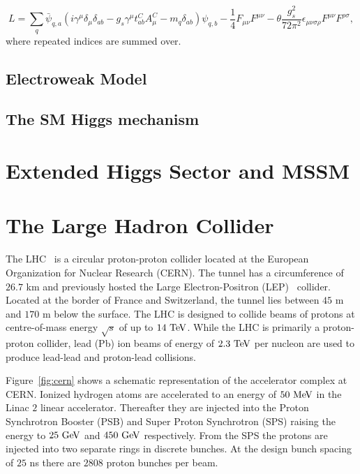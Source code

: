  \begin{equation} \label{eq:lumi}
L = \sum_{q} \bar{\psi}_{q,a} (i \gamma^{\mu}\delta_{\mu}\delta_{ab}-g_{s}\gamma^{\mu}t^{C}_{ab}A^{C}_{\mu}-m_{q}\delta_{ab})\psi_{q,b}-\frac{1}{4}F_{\mu\nu}F^{\mu\nu}-\theta\frac{g_{s}^2}{72\pi^2}\epsilon_{\mu\nu\sigma\rho}F^{\mu\nu}F^{\rho\sigma},
\end{equation}
where repeated indices are summed over.

\subsection{Electroweak Model}

\subsection{The SM Higgs mechanism}

\section{Extended Higgs Sector and MSSM}
    
\section{The Large Hadron Collider}
The LHC~\cite{1748-0221-3-08-S08001} is a circular proton-proton collider located at the European Organization for Nuclear Research (CERN). The tunnel has a circumference of $26.7$ km and previously hosted the Large Electron-Positron (LEP)~\cite{lep1,lep2} collider. Located at the border of France and Switzerland, the tunnel lies between $45$ m and $170$ m below the surface. The LHC is designed to collide beams of protons at centre-of-mass energy $\sqrt{s}$ of up to $14~\mathrm{Te\kern -0.1em V}$. While the LHC is primarily a proton-proton collider, lead (Pb) ion beams of energy of $2.3~\mathrm{Te\kern -0.1em V}$ per nucleon are used to produce lead-lead  and proton-lead collisions.  
 
Figure~\ref{fig:cern} shows a schematic representation of the accelerator complex at CERN. Ionized hydrogen atoms are accelerated to an energy of $50~\mathrm{Me\kern -0.1em V}$ in the Linac $2$ linear accelerator. Thereafter they are injected into the Proton Synchrotron Booster (PSB) and Super Proton Synchrotron (SPS) raising the energy to $25~\mathrm{Ge\kern -0.1em V}$ and $450~\mathrm{Ge\kern -0.1em V}$ respectively. From the SPS the protons are injected into two separate rings in discrete bunches. At the design bunch spacing of $25$ ns there are $2808$ proton bunches per beam. 

